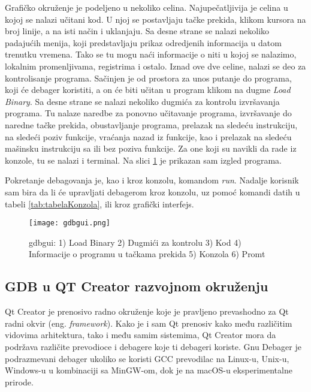 \documentclass[a4paper]{article}
\begin{document}
Grafičko okruženje je podeljeno u nekoliko celina. Najupečatljivija je celina u kojoj se nalazi učitani kod. 
U njoj se postavljaju tačke prekida, klikom kursora na broj linije, a na isti način i uklanjaju.
Sa desne strane se nalazi nekoliko padajućih menija, koji predstavljaju prikaz odredjenih informacija 
u datom trenutku vremena. Tako se tu mogu naći informacije o niti u kojoj se nalazimo, lokalnim promenljivama, 
registrima i ostalo. Iznad ove dve celine, nalazi se deo za kontrolisanje programa. Sačinjen je od prostora
za unos putanje do programa, koji će debager koristiti, a on će biti učitan u program klikom na dugme 
\textit{Load Binary}. Sa desne strane se nalazi nekoliko dugmića za kontrolu izvršavanja programa.
Tu nalaze naredbe za ponovno učitavanje programa, izvršavanje do naredne tačke prekida, obustavljanje
programa, prelazak na sledeću instrukciju, na sledeći poziv funkcije, vraćanja nazad iz funkcije, kao i prelazak
na sledeću mašinsku instrukciju sa ili bez poziva funkcije. Za one koji su navikli da rade iz konzole, tu se nalazi 
i terminal. Na slici \ref{fig:gdbgui} je prikazan sam izgled programa.

Pokretanje debagovanja je, kao i kroz konzolu, komandom \textit{run}. Nadalje korisnik sam bira da li će 
upravljati debagerom kroz konzolu, uz pomoć komandi datih u tabeli \ref{tab:tabelaKonzola}, ili kroz grafički interfejs.

\begin{figure}[h!]
\begin{center}
\texttt{[image: gdbgui.png]}
\end{center}
\caption{gdbgui: 1) Load Binary 2) Dugmići za kontrolu 3) Kod 4) Informacije o programu u tačkama prekida 5) Konzola 6) Promt}
\label{fig:gdbgui}
\end{figure}

\subsection{GDB u QT Creator razvojnom okruženju}
\label{subsec:QT}

Qt Creator je prenosivo radno okruženje koje je pravljeno prevashodno za Qt radni okvir (eng. \textit{framework}).
Kako je i sam Qt prenosiv kako među različitim vidovima arhitektura, tako i među samim sistemima, Qt Creator
mora da podržava različite prevodioce i debagere koje ti debageri koriste. Gnu Debager je podrazmevani debager
ukoliko se koristi GCC prevodilac na Linux-u, Unix-u, Windows-u u kombinaciji sa MinGW-om, dok je na macOS-u
eksperimentalne prirode. \cite{QT}
\end{document}
